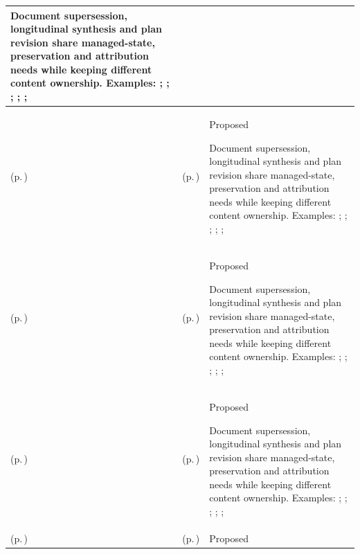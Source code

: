 \begin{longtable}{|>{\raggedright\arraybackslash}p{0.27\TableWidth}|>{\raggedright\arraybackslash}p{0.27\TableWidth}|>{\raggedright\arraybackslash}p{0.46\TableWidth}|}
Document supersession, longitudinal synthesis and plan revision share managed-state, preservation and attribution needs while keeping different content ownership. Examples: \nameref{feature:feat-sa-23}; \nameref{feature:feat-sa-24}; \nameref{feature:feat-sa-25}; \nameref{function:receive-clinical-document}; \nameref{service:clinical-document-ingress}; \nameref{function:govern-clinical-document-lifecycle}\\\hline
\nameref{cap:bec-clinical-record-administration} (p.\,\pageref{cap:bec-clinical-record-administration}) & \nameref{cap:ec-07} (p.\,\pageref{cap:ec-07}) & Proposed

Document supersession, longitudinal synthesis and plan revision share managed-state, preservation and attribution needs while keeping different content ownership. Examples: \nameref{feature:feat-sa-23}; \nameref{feature:feat-sa-24}; \nameref{feature:feat-sa-25}; \nameref{function:receive-clinical-document}; \nameref{service:clinical-document-ingress}; \nameref{function:govern-clinical-document-lifecycle}\\\hline
\nameref{cap:bec-patient-clinical-record} (p.\,\pageref{cap:bec-patient-clinical-record}) & \nameref{cap:ec-03} (p.\,\pageref{cap:ec-03}) & Proposed

Document supersession, longitudinal synthesis and plan revision share managed-state, preservation and attribution needs while keeping different content ownership. Examples: \nameref{feature:feat-ise-01}; \nameref{feature:feat-ise-02}; \nameref{feature:feat-ise-03}; \nameref{function:assemble-longitudinal-clinical-record}; \nameref{service:longitudinal-clinical-record-query}; \nameref{function:maintain-active-clinical-record}\\\hline
\nameref{cap:bec-patient-clinical-record} (p.\,\pageref{cap:bec-patient-clinical-record}) & \nameref{cap:ec-04} (p.\,\pageref{cap:ec-04}) & Proposed

Document supersession, longitudinal synthesis and plan revision share managed-state, preservation and attribution needs while keeping different content ownership. Examples: \nameref{feature:feat-ise-01}; \nameref{feature:feat-ise-02}; \nameref{feature:feat-ise-03}; \nameref{function:assemble-longitudinal-clinical-record}; \nameref{service:longitudinal-clinical-record-query}; \nameref{function:maintain-active-clinical-record}\\\hline
\nameref{cap:bec-patient-clinical-record} (p.\,\pageref{cap:bec-patient-clinical-record}) & \nameref{cap:ec-07} (p.\,\pageref{cap:ec-07}) & Proposed


\end{longtable}
